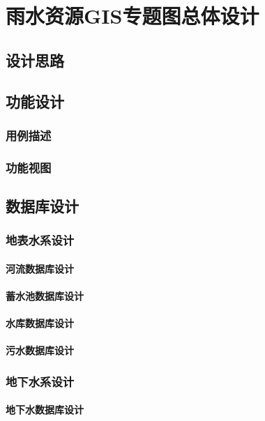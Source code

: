 \chapter{雨水资源GIS专题图总体设计}



\section{设计思路}

\section{功能设计}
\subsection{用例描述}
\subsection{功能视图}

\section{数据库设计}
\subsection{地表水系设计}
\subsubsection{河流数据库设计}
\subsubsection{蓄水池数据库设计}
\subsubsection{水库数据库设计}
\subsubsection{污水数据库设计}
\subsection{地下水系设计}
\subsubsection{地下水数据库设计}
